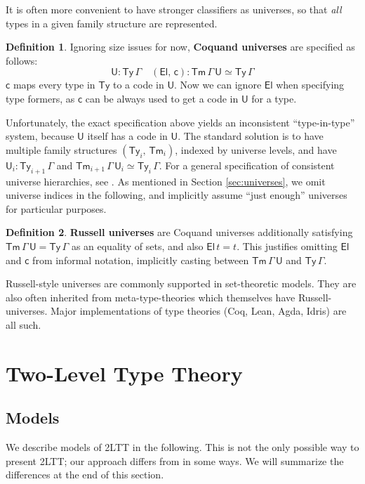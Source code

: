\documentclass[12pt,a4paper,twoside,openany]{book}
\theoremstyle{remark}
\theoremstyle{definition}
\newtheorem{mydefinition}{Definition}
\theoremstyle{theorem}
\newcommand{\ms}[1]{\mathsf{#1}}
\newcommand{\Tm}{\mathsf{Tm}}
\newcommand{\Ty}{\mathsf{Ty}}
\newcommand{\U}{\mathsf{U}}
\newcommand{\El}{\mathsf{El}}
\begin{document}
It is often more convenient to have stronger classifiers as universes, so that
\emph{all} types in a given family structure are represented.

\begin{mydefinition}
Ignoring size issues for now, \textbf{Coquand universes} \cite{TODO} are
specified as follows:
\[
  \U : \Ty\,\Gamma\hspace{1em} (\El,\,\ms{c}) : \Tm\,\Gamma\,\U \simeq \Ty\,\Gamma
\]
$\ms{c}$ maps every type in $\Ty$ to a code in $\U$. Now we can ignore $\El$
when specifying type formers, as $\ms{c}$ can be always used to get a code in
$\U$ for a type.
\end{mydefinition}

Unfortunately, the exact specification above yields an inconsistent
``type-in-type'' system, because $\U$ itself has a code in $\U$. The standard
solution is to have multiple family structures $(\Ty_i,\,\Tm_i)$, indexed by
universe levels, and have $\U_i : \Ty_{i + 1}\,\Gamma$ and
$\Tm_{i+1}\,\Gamma\,\U_i \simeq \Ty_i\,\Gamma$. For a general specification of
consistent universe hierarchies, see \cite{kovacs2021generalized}. As mentioned in Section
\ref{sec:universes}, we omit universe indices in the following, and implicitly
assume ``just enough'' universes for particular purposes.

\begin{mydefinition}
\textbf{Russell universes} are Coquand universes additionally satisfying
$\Tm\,\Gamma\,\U = \Ty\,\Gamma$ as an equality of sets, and also $\ms{El}\,t =
t$. This justifies omitting $\El$ and $\ms{c}$ from informal notation,
implicitly casting between $\Tm\,\Gamma\,\U$ and $\Ty\,\Gamma$.
\end{mydefinition}
Russell-style universes are commonly supported in set-theoretic models. They are
also often inherited from meta-type-theories which themselves have
Russell-universes. Major implementations of type theories (Coq, Lean, Agda,
Idris) are all such.


\section{Two-Level Type Theory}

\subsection{Models}

We describe models of 2LTT in the following. This is not the only possible way
to present 2LTT; our approach differs from \cite{twolevel} in some ways. We will summarize
the differences at the end of this section.
\end{document}
